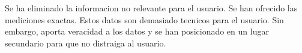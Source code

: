 \begin{itemize}
    \done Se ha eliminado la informacion no relevante para el usuario.
    \crossed Se han ofrecido las mediciones exactas. Estos datos son demasiado tecnicos para el usuario. Sin embargo,
    aporta veracidad a los datos y se han  posicionado en un lugar secundario para que no distraiga al usuario.
    
\end{itemize}
 \newpage